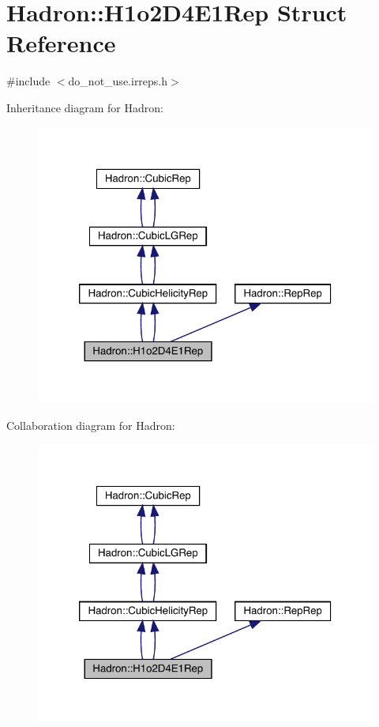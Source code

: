 \hypertarget{structHadron_1_1H1o2D4E1Rep}{}\section{Hadron\+:\+:H1o2\+D4\+E1\+Rep Struct Reference}
\label{structHadron_1_1H1o2D4E1Rep}


{\ttfamily \#include $<$do\+\_\+not\+\_\+use.\+irreps.\+h$>$}



Inheritance diagram for Hadron\+:\nopagebreak
\begin{figure}[H]
\begin{center}
\leavevmode
\includegraphics[width=320pt]{d6/d1e/structHadron_1_1H1o2D4E1Rep__inherit__graph}
\end{center}
\end{figure}


Collaboration diagram for Hadron\+:\nopagebreak
\begin{figure}[H]
\begin{center}
\leavevmode
\includegraphics[width=320pt]{dc/d3e/structHadron_1_1H1o2D4E1Rep__coll__graph}
\end{center}
\end{figure}
